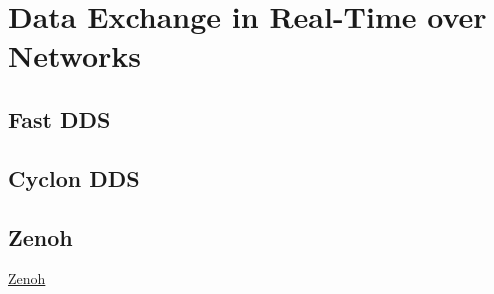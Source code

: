 \section{Data Exchange in Real-Time over Networks}\label{c3_sec_dds}


\subsection{Fast DDS}
\subsection{Cyclon DDS}


\subsection{Zenoh}
\href{https://www.adlinktech.com/en/Zenoh}{Zenoh} 

